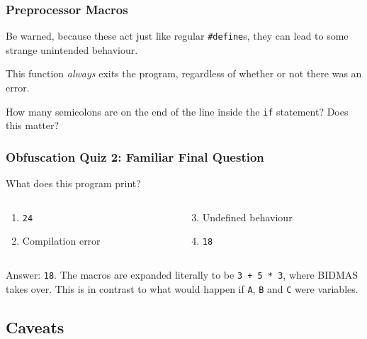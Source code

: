 \documentclass[xcolor]{beamer}
\begin{document}
\begin{frame}
	\frametitle{Preprocessor Macros}
	\pause
	
	\small
	Be warned, because these act just like regular \texttt{\#define}s, they can lead to some strange unintended behaviour.
	\pause
	
	This function \textit{always} exits the program, regardless of whether or not there was an error.
	\pause
	
	
	\pause
	
	How many semicolons are on the end of the line inside the \texttt{if} statement? Does this matter?
\end{frame}

\begin{frame}
	\frametitle{Obfuscation Quiz 2: Familiar Final Question}
	\pause
	
	What does this program print?
	
	
	\pause
	
	\begin{columns}
		\begin{column}{0.45\textwidth}
			\begin{enumerate}
				\item \texttt{24}
				\pause
				\item Compilation error
			\end{enumerate}
		\end{column}
		\pause
		\begin{column}{0.45\textwidth}
			\begin{enumerate}
				\setcounter{enumi}{2}
				\item Undefined behaviour
				\pause
				\item \texttt{18}
			\end{enumerate}
		\end{column}
	\end{columns}
	\pause
	
	\vspace{0.5cm}
	
	Answer: \texttt{18}. \pause The macros are expanded literally to be \texttt{3 + 5 * 3}, where BIDMAS takes over. \pause This is in contrast to what would happen if \texttt{A}, \texttt{B} and \texttt{C} were variables.
\end{frame}

\subsection{Caveats}
\end{document}
